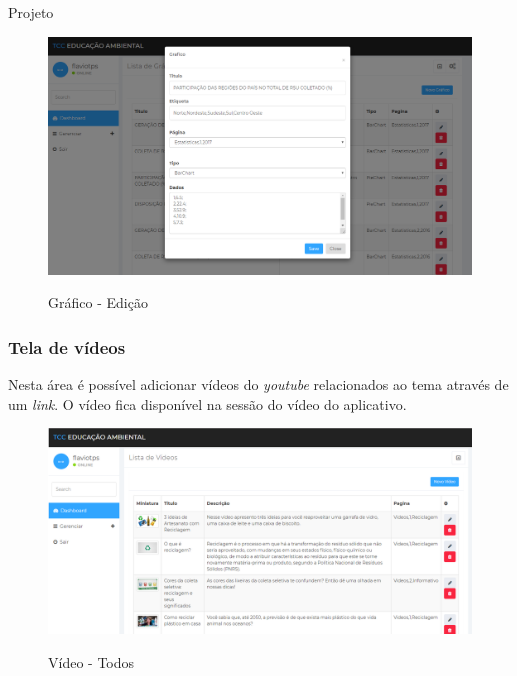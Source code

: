 \documentclass[
	12pt,				%
	openright,			%
	twoside,			%
	a4paper,			%
	english,			%
	french,				%
	spanish,			%
	brazil				%
	]{abntex2}
\begin{document}
\begin{chapter}{Projeto}
\begin{figure}[h]
\centering
   \caption{Gráfico - Edição}
   \includegraphics[scale=0.40]{media/tela_graficos_site_2.png}
     \label{fig:tela_graficos_site_2}
\end{figure}

\newpage
\subsubsection{Tela de vídeos} \label{tela_video}
Nesta área é possível adicionar vídeos do \textit{youtube} relacionados ao tema através de um \textit{link}. O vídeo fica disponível na sessão do vídeo do aplicativo.

\begin{figure}[h]
\centering
   \caption{Vídeo - Todos}
   \includegraphics[scale=0.40]{media/tela_video_site_1.png}
     \label{fig:tela_video_site_1}
\end{figure}


\end{chapter}
\end{document}
